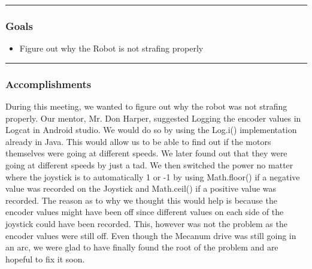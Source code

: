 \noindent\hfil\rule{\textwidth}{.4pt}\hfil
\subsubsection*{Goals}
\begin{itemize}
    \item Figure out why the Robot is not strafing properly

\end{itemize} 

\noindent\hfil\rule{\textwidth}{.4pt}\hfil

\subsubsection*{Accomplishments}
During this meeting, we wanted to figure out why the robot was not strafing properly. Our mentor, Mr. Don Harper, suggested Logging the encoder values in Logcat in Android studio. We would do so by using the Log.i() implementation already in Java. This would allow us to be able to find out if the motors themselves were going at different speeds. We later found out that they were going at different speeds by just a tad. We then switched the power no matter where the joystick is to automatically 1 or -1 by using Math.floor() if a negative value was recorded on the Joystick and Math.ceil() if a positive value was recorded. The reason as to why we thought this would help is because the encoder values might have been off since different values on each side of the joystick could have been recorded. This, however was not the problem as the encoder values were still off. Even though the Mecanum drive was still going in an arc, we were glad to have finally found the root of the problem and are hopeful to fix it soon.




